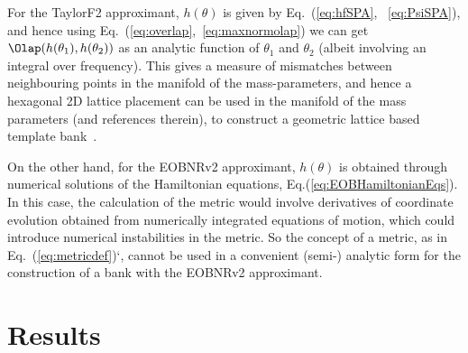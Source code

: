 For the TaylorF2 approximant, $h(\theta)$ is given by Eq.~(\ref{eq:hfSPA},
~\ref{eq:PsiSPA}), and hence using Eq.~(\ref{eq:overlap},~\ref{eq:maxnormolap}) we 
can get $\Olap(h(\theta_1),h(\theta_2))$ as an analytic function of $\theta_1$ 
and $\theta_2$ (albeit involving an integral over frequency).
This gives a measure of mismatches between neighbouring points in the manifold 
of the mass-parameters, and hence a hexagonal 2D lattice placement can be used 
in the manifold of the mass parameters \citep{SathyaMetric2PN} (and references therein), 
to construct a geometric lattice based template bank~\citep{SathyaBankPlacementTauN,OwenTemplateSpacing,SathyaMetric2PN}. 
 
On the other hand, for the EOBNRv2 approximant, $h(\theta)$ is obtained through 
numerical solutions of the Hamiltonian equations, Eq.(\ref{eq:EOBHamiltonianEqs}). 
In this case, the calculation of the metric would involve derivatives of coordinate
evolution obtained from numerically integrated equations of motion, 
which could introduce numerical instabilities in the metric. So the concept of 
a metric, as in Eq.~(\ref{eq:metricdef})`, cannot be used in a convenient (semi-) 
analytic form for the construction of a bank with the EOBNRv2 approximant.

\section{Results}
\label{s:results}

